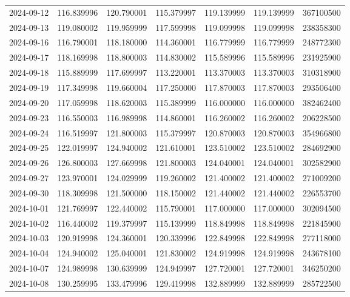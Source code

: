 \begin{tabular}{lrrrrrr}
2024-09-12 &  116.839996 &  120.790001 &  115.379997 &  119.139999 &  119.139999 &   367100500 \\
2024-09-13 &  119.080002 &  119.959999 &  117.599998 &  119.099998 &  119.099998 &   238358300 \\
2024-09-16 &  116.790001 &  118.180000 &  114.360001 &  116.779999 &  116.779999 &   248772300 \\
2024-09-17 &  118.169998 &  118.800003 &  114.830002 &  115.589996 &  115.589996 &   231925900 \\
2024-09-18 &  115.889999 &  117.699997 &  113.220001 &  113.370003 &  113.370003 &   310318900 \\
2024-09-19 &  117.349998 &  119.660004 &  117.250000 &  117.870003 &  117.870003 &   293506400 \\
2024-09-20 &  117.059998 &  118.620003 &  115.389999 &  116.000000 &  116.000000 &   382462400 \\
2024-09-23 &  116.550003 &  116.989998 &  114.860001 &  116.260002 &  116.260002 &   206228500 \\
2024-09-24 &  116.519997 &  121.800003 &  115.379997 &  120.870003 &  120.870003 &   354966800 \\
2024-09-25 &  122.019997 &  124.940002 &  121.610001 &  123.510002 &  123.510002 &   284692900 \\
2024-09-26 &  126.800003 &  127.669998 &  121.800003 &  124.040001 &  124.040001 &   302582900 \\
2024-09-27 &  123.970001 &  124.029999 &  119.260002 &  121.400002 &  121.400002 &   271009200 \\
2024-09-30 &  118.309998 &  121.500000 &  118.150002 &  121.440002 &  121.440002 &   226553700 \\
2024-10-01 &  121.769997 &  122.440002 &  115.790001 &  117.000000 &  117.000000 &   302094500 \\
2024-10-02 &  116.440002 &  119.379997 &  115.139999 &  118.849998 &  118.849998 &   221845900 \\
2024-10-03 &  120.919998 &  124.360001 &  120.339996 &  122.849998 &  122.849998 &   277118000 \\
2024-10-04 &  124.940002 &  125.040001 &  121.830002 &  124.919998 &  124.919998 &   243678100 \\
2024-10-07 &  124.989998 &  130.639999 &  124.949997 &  127.720001 &  127.720001 &   346250200 \\
2024-10-08 &  130.259995 &  133.479996 &  129.419998 &  132.889999 &  132.889999 &   285722500 \\

\end{tabular}
